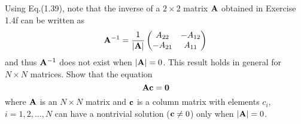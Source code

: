 \documentclass[a4paper]{book}
\newcounter{exercise}[chapter]
\newcounter{solution}[chapter]
\newcommand{\A}{{\bf A}}
\begin{document}
	\begin{solution}
	
	\end{solution}
	
	\begin{exercise}
	Using Eq.(1.39), note that the inverse of a $2\times2$ matrix $\A$ obtained in Exercise 1.4f can be written as
	\[
		\A^{-1} = \frac{1}{|\A|}\begin{pmatrix}
			A_{22} & -A_{12} \\ -A_{21} & A_{11}
		\end{pmatrix}
	\]
	and thus $\A^{-1}$ does not exist when $|\A|=0$. This result holds in general for $N\times N$ matrices. Show that the equation
	\[
		\A {\bf c} = {\bf 0}
	\]
	where $\A$ is an $N \times N$ matrix and ${\bf c}$ is a column matrix with elements $c_i$, $i=1,2,\ldots,N$ can have a nontrivial solution (${\bf c} \neq 0$) only when $|\A|=0$.
	\end{exercise}
	
	\begin{solution}
	
	\end{solution}
	
\end{document}
